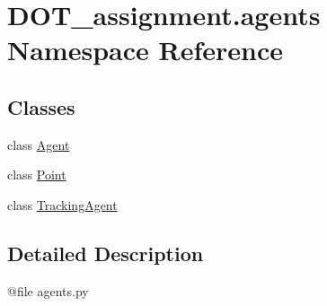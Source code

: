\hypertarget{namespace_d_o_t__assignment_1_1agents}{}\section{D\+O\+T\+\_\+assignment.\+agents Namespace Reference}
\label{namespace_d_o_t__assignment_1_1agents}
\subsection*{Classes}
\begin{DoxyCompactItemize}
\item 
class \mbox{\hyperlink{class_d_o_t__assignment_1_1agents_1_1_agent}{Agent}}
\item 
class \mbox{\hyperlink{class_d_o_t__assignment_1_1agents_1_1_point}{Point}}
\item 
class \mbox{\hyperlink{class_d_o_t__assignment_1_1agents_1_1_tracking_agent}{Tracking\+Agent}}
\end{DoxyCompactItemize}


\subsection{Detailed Description}
\begin{DoxyVerb}@file agents.py
\end{DoxyVerb}
 